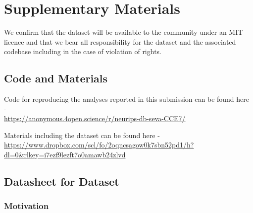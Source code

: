 \documentclass{article}
\begin{document}
\section{Supplementary Materials}
We confirm that the dataset will be available to the community under an MIT licence and that we bear all responsibility for the dataset and the associated codebase including in the case of violation of rights.
\subsection{Code and Materials}

Code for reproducing the analyses reported in this submission can be found here - \\{\url{https://anonymous.4open.science/r/neurips-db-seva-CCE7/}}

Materials including the dataset can be found here - \\{\url{https://www.dropbox.com/scl/fo/2oqncsagow0k7sbn52pd1/h?dl=0&rlkey=i7ezf9lezft7o0amawb24zlvd}}



\subsection{Datasheet for Dataset}
\subsubsection{Motivation}
\end{document}
